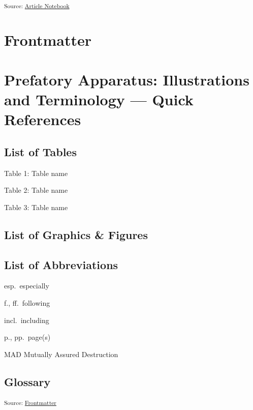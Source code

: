 \documentclass[12pt,a4paper]{book}      %
\begin{document}


\textsubscript{Source:
\href{https://VJMeyer.github.io/submission/thesis.qmd.html}{Article
Notebook}}

\chapter{}\label{section}

\chapter{Frontmatter}\label{frontmatter}

\chapter{Prefatory Apparatus: Illustrations and Terminology --- Quick
References}\label{prefatory-apparatus-illustrations-and-terminology-quick-references}

\section{List of Tables}\label{list-of-tables}

Table 1: Table name

Table 2: Table name

Table 3: Table name

\section{List of Graphics \& Figures}\label{list-of-graphics-figures}

\section{List of Abbreviations}\label{list-of-abbreviations}

esp.~especially

f., ff.~following

incl.~including

p., pp.~page(s)

MAD Mutually Assured Destruction

\section{Glossary}\label{glossary}

\textsubscript{Source:
\href{https://VJMeyer.github.io/submission/chapters/Frontmatter.qmd.html\#8315e7ab-034a-4a00-a97f-2592806b557d}{Frontmatter}}
\end{document}
